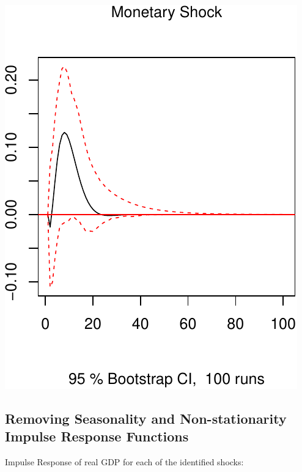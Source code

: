 \documentclass[11pt,preprint, authoryear]{elsarticle}
\numberwithin{equation}{section}
\numberwithin{figure}{section}
\numberwithin{table}{section}
\begin{document}
\includegraphics{TS_proj_files/figure-latex/unnamed-chunk-38-3.pdf}

\hypertarget{removing-seasonality-and-non-stationarity-impulse-response-functions}{%
\subsection{Removing Seasonality and Non-stationarity Impulse Response
Functions}\label{removing-seasonality-and-non-stationarity-impulse-response-functions}}

Impulse Response of real GDP for each of the identified shocks:
\end{document}
